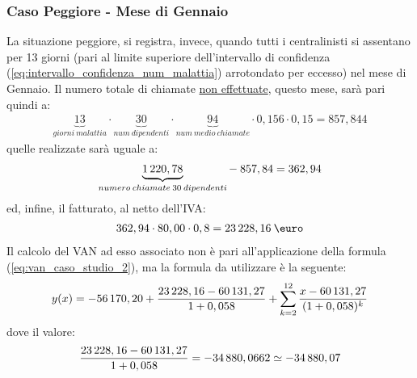 \subsubsection[Caso Peggiore - Mese di Gennaio]{Caso Peggiore - Mese di Gennaio}
La situazione peggiore, si registra, invece, quando tutti i centralinisti si assentano per 13 giorni (pari al limite superiore dell'intervallo di confidenza (\ref{eq:intervallo_confidenza_num_malattia}) arrotondato per eccesso) nel mese di Gennaio.
\newline
Il numero totale di chiamate \underline{non effettuate}, questo mese, sarà pari quindi a: 
	\begin{equation}
	\label{eq:totale_chiamate_non_effettuate_gennaio}
	\begin{split}
		\underbrace{13}_{giorni \: malattia} \cdot \underbrace{30}_{num\: dipendenti} \cdot \underbrace{94}_{num \: medio \: chiamate} \cdot 0,156 \cdot 0,15 = 857,844 
 	\end{split}
	\end{equation}
quelle realizzate sarà uguale a:
	\begin{equation}
	\label{eq:totale_chiamate_effettuate_gennaio}
	\begin{split}
		\underbrace{1\thinspace 220,78}_{numero\: chiamate \: 30 \: dipendenti} - \: 857,84 = 362,94
 	\end{split}
	\end{equation}	
ed, infine, il fatturato, al netto dell'IVA:
	\begin{equation}
	\label{eq:fatturato_gennaio}
	\begin{split}
		362,94 \cdot 80,00 \cdot 0,8 = 23\thinspace 228,16 \: \mbox{\euro}
 	\end{split}
	\end{equation}
Il calcolo del VAN ad esso associato non è pari all'applicazione della formula (\ref{eq:van_caso_studio_2}), ma la formula da utilizzare è la seguente:
	\begin{equation}
	\label{eq:van_caso_gennaio}
	\begin{split}
		y(x) = -56\thinspace 170,20 + \frac{23\thinspace 228,16 - 60\thinspace 131,27}{1+0,058} + \sum_{k=2}^{12} \frac{x - 60\thinspace 131,27} {(1+0,058)^{k}}
 	\end{split}
	\end{equation}
dove il valore:
	\begin{equation}
	\label{eq:attualizzazione_gennaio}
	\begin{split}
		\frac{23\thinspace 228,16 - 60\thinspace 131,27}{1+0,058} = -34\thinspace 880,0662 \simeq -34\thinspace 880,07
 	\end{split}
	\end{equation}
